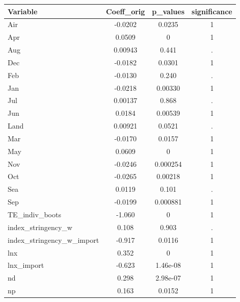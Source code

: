 \documentclass[]{article}
\begin{document}
\begin{tabular}{lccc} \hline
Variable & Coeff\_orig & p\_values & significance \\ \hline
Air & -0.0202 & 0.0235 & 1 \\
Apr & 0.0509 & 0 & 1 \\
Aug & 0.00943 & 0.441 & . \\
Dec & -0.0182 & 0.0301 & 1 \\
Feb & -0.0130 & 0.240 & . \\
Jan & -0.0218 & 0.00330 & 1 \\
Jul & 0.00137 & 0.868 & . \\
Jun & 0.0184 & 0.00539 & 1 \\
Land & 0.00921 & 0.0521 & . \\
Mar & -0.0170 & 0.0157 & 1 \\
May & 0.0609 & 0 & 1 \\
Nov & -0.0246 & 0.000254 & 1 \\
Oct & -0.0265 & 0.00218 & 1 \\
Sea & 0.0119 & 0.101 & . \\
Sep & -0.0199 & 0.000881 & 1 \\
TE\_indiv\_boots & -1.060 & 0 & 1 \\
index\_stringency\_w & 0.108 & 0.903 & . \\
index\_stringency\_w\_import & -0.917 & 0.0116 & 1 \\
lnx & 0.352 & 0 & 1 \\
lnx\_import & -0.623 & 1.46e-08 & 1 \\
nd & 0.298 & 2.98e-07 & 1 \\
 np & 0.163 & 0.0152 & 1 \\ \hline
\end{tabular}
\end{document}
